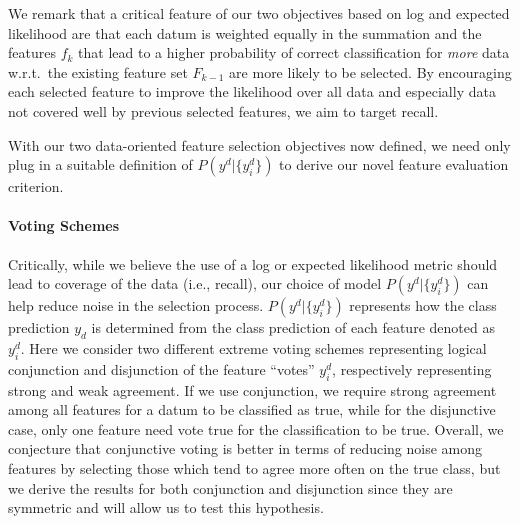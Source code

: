 
We remark that a critical feature of our two objectives based on log
and expected likelihood are that each datum is weighted equally in the
summation and the features $f_k$ that lead to a higher probability of
correct classification for \emph{more} data w.r.t.\ the existing
feature set $F_{k-1}$ are more likely to be selected.  By encouraging
each selected feature to improve the likelihood over all data and
especially data not covered well by previous selected features, we aim
to target recall.

With our two data-oriented feature selection objectives now defined,
we need only plug in a suitable definition of $P(y^d|\{y^d_i\})$ to
derive our novel feature evaluation criterion.


\paragraph{Voting Schemes}

Critically, while we believe the use of a log or expected likelihood
metric should lead to coverage of the data (i.e., recall), our choice
of model $P(y^d|\{y^d_i\})$ can help reduce noise in the selection
process.  $P(y^d|\{y^d_i\})$ represents how the class prediction $y_d$
is determined from the class prediction of each feature denoted as
$y^d_i$.  Here we consider two different extreme voting schemes
representing logical conjunction and disjunction of the feature
``votes'' $y^d_i$, respectively representing strong and weak
agreement.  If we use conjunction, we require strong agreement among
all features for a datum to be classified as true, while for the
disjunctive case, only one feature need vote true for the
classification to be true.  Overall, we conjecture that conjunctive
voting is better in terms of reducing noise among features by
selecting those which tend to agree more often on the true class, but
we derive the results for both conjunction and disjunction since they
are symmetric and will allow us to test this hypothesis.

